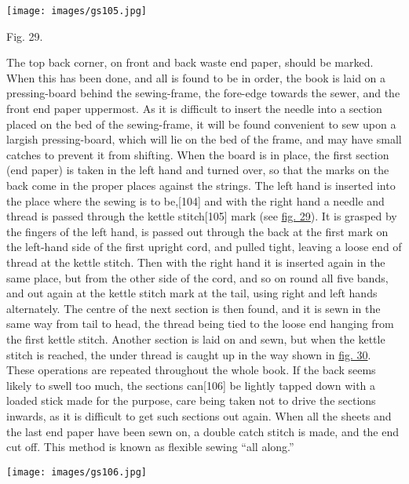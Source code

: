 \documentclass[
]{article}
\begin{document}
\protect\hypertarget{Fig_29}{}{}
\texttt{[image: images/gs105.jpg]}

Fig. 29.

The top back corner, on front and back waste end paper, should be
marked. When this has been done, and all is found to be in order, the
book is laid on a pressing-board behind the sewing-frame, the fore-edge
towards the sewer, and the front end paper uppermost. As it is difficult
to insert the needle into a section placed on the bed of the
sewing-frame, it will be found convenient to sew upon a largish
pressing-board, which will lie on the bed of the frame, and may have
small catches to prevent it from shifting. When the board is in place,
the first section (end paper) is taken in the left hand and turned over,
so that the marks on the back come in the proper places against the
strings. The left hand is inserted into the place where the sewing is to
be,{\protect\hypertarget{Page_104}{}{{[}104{]}}} and with the right hand
a needle and thread is passed through the kettle
stitch{\protect\hypertarget{Page_105}{}{{[}105{]}}} mark (see
\protect\hyperlink{Fig_29}{fig. 29}). It is grasped by the fingers of
the left hand, is passed out through the back at the first mark on the
left-hand side of the first upright cord, and pulled tight, leaving a
loose end of thread at the kettle stitch. Then with the right hand it is
inserted again in the same place, but from the other side of the cord,
and so on round all five bands, and out again at the kettle stitch mark
at the tail, using right and left hands alternately. The centre of the
next section is then found, and it is sewn in the same way from tail to
head, the thread being tied to the loose end hanging from the first
kettle stitch. Another section is laid on and sewn, but when the kettle
stitch is reached, the under thread is caught up in the way shown in
\protect\hyperlink{Fig_30}{fig. 30}. These operations are repeated
throughout the whole book. If the back seems likely to swell too much,
the sections can{\protect\hypertarget{Page_106}{}{{[}106{]}}} be lightly
tapped down with a loaded stick made for the purpose, care being taken
not to drive the sections inwards, as it is difficult to get such
sections out again. When all the sheets and the last end paper have been
sewn on, a double catch stitch is made, and the end cut off. This method
is known as flexible sewing ``all along.''

\protect\hypertarget{Fig_30}{}{}
\texttt{[image: images/gs106.jpg]}
\end{document}
